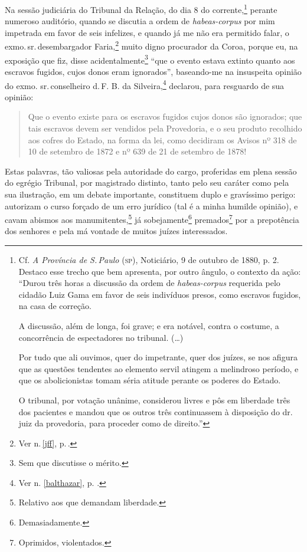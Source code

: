 Na sessão judiciária do Tribunal da Relação, do dia 8 do
corrente,\footnote{Cf. \emph{A Província de S.\,Paulo} (\textsc{sp}), Noticiário,
  9 de outubro de 1880, p. 2. Destaco esse trecho que bem apresenta, por outro
  ângulo, o contexto da ação: ``Durou três horas a discussão da ordem de
  \emph{habeas-corpus} requerida pelo cidadão Luiz Gama em favor de seis
  indivíduos presos, como escravos fugidos, na casa de correção.

  A discussão, além de longa, foi grave; e era notável, contra o
  costume, a concorrência de espectadores no tribunal. (\ldots{})

  Por tudo que ali ouvimos, quer do impetrante, quer dos juízes, se nos
  afigura que as questões tendentes ao elemento servil atingem a
  melindroso período, e que os abolicionistas tomam séria atitude
  perante os poderes do Estado.

  O tribunal, por votação unânime, considerou livres e pôs em liberdade
  três dos pacientes e mandou que os outros três continuassem à
  disposição do dr.\,juiz da provedoria, para proceder como de direito.''}
perante numeroso auditório, quando se discutia a ordem de
\emph{habeas-corpus} por mim impetrada em favor de seis infelizes, e
quando já me não era permitido falar, o exmo.\,sr.\,desembargador
Faria,\footnote{Ver n.\,\ref{jff}, p.\,\pageref{jff}.} muito digno procurador da Coroa, porque eu, na
exposição que fiz, disse acidentalmente\footnote{Sem que discutisse o
  mérito.} ``que o evento estava extinto quanto aos escravos fugidos,
cujos donos eram ignorados'', baseando-me na insuspeita opinião do exmo.
sr.\,conselheiro d.\,F. B. da Silveira,\footnote{Ver n. \ref{balthazar}, p. \pageref{balthazar}.} declarou, para resguardo de sua opinião:

\begin{quote}
Que o evento existe para os escravos fugidos cujos donos são ignorados;
que tais escravos devem ser vendidos pela Provedoria, e o seu produto
recolhido aos cofres do Estado, na forma da lei, como decidiram os
Avisos nº 318 de 10 de setembro de 1872 e nº 639 de 21 de setembro de
1878!
\end{quote}

Estas palavras, tão valiosas pela autoridade do cargo, proferidas em
plena sessão do egrégio Tribunal, por magistrado distinto, tanto pelo
seu caráter como pela sua ilustração, em um debate importante,
constituem duplo e gravíssimo perigo: autorizam o curso forçado de um
erro jurídico (tal é a minha humilde opinião), e cavam abismos aos
manumitentes,\footnote{Relativo aos que demandam liberdade.} já
sobejamente\footnote{Demasiadamente.} premados\footnote{Oprimidos,
  violentados.} por a
prepotência dos senhores e pela má vontade de muitos juízes
interessados.

